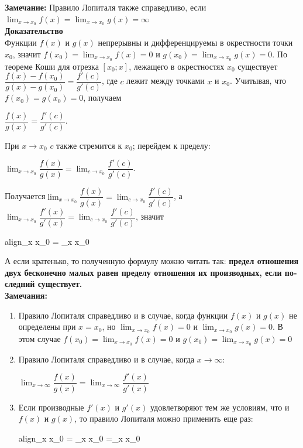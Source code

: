 \documentclass[oneside]{book}
\newcommand{\boxedeq}[2]{\begin{empheq}[box={\fboxsep=6pt\fbox}]{align}\label{#1}#2\end{empheq}}
\begin{document}
\begin{enumerate}
\begin{itemize}
\textbf{Замечание:}
Правило Лопиталя также справедливо, если  $\lim_{x \to x_{0}} f(x) =\lim_{x \to x_{0}} g(x) = \infty$\\

\textbf{Доказательство}\\
Функции $f(x)$ и $g(x)$ непрерывны и дифференцируемы в окрестности точки $x_{0}$, значит
$f(x_{0})=\lim_{x \to x_{0}} f(x) = 0$ и $g(x_{0})=\lim_{x \to x_{0}} g(x) = 0$. По теореме Коши для отрезка $[x_{0};x]$, лежащего в окрестностях $x_{0}$ существует $\dfrac{f(x)-f(x_{0})}{g(x)-g(x_{0})}=\dfrac{f'(c)}{g'(c)}$, где $c$ лежит между точками $x$ и $x_{0}$. Учитывая, что  $f(x_{0})=g(x_{0})=0$, получаем \begin{center}
	$\dfrac{f(x)}{g(x)}=\dfrac{f'(c)}{g'(c)}$.
\end{center} При $x\to x_{0}$ $c$ также стремится к $x_{0}$; перейдем к пределу: \begin{center}
	$\lim_{x \to x_{0}} \dfrac{f(x)}{g(x)} = \lim_{c \to x_{0}} \dfrac{f'(c)}{g'(c)}$.

\end{center}
Получается$\lim_{x \to x_{0}} \dfrac{f(x)}{g(x)} = \lim_{c \to x_{0}} \dfrac{f'(c)}{g'(c)}$, а $\lim_{x \to x_{0}} \dfrac{f'(x)}{g'(x)} = \lim_{c \to x_{0}} \dfrac{f'(c)}{g'(c)}$, значит \begin{center}
	\boxedeq{eq:*}{\lim_{x{\large } \to x_{0}}  = \lim_{x \to x_{0}} \dfrac{f'(x)}{g'(x)}}
\end{center}
А если кратенько, то полученную формулу можно читать так: \textbf{предел отношения двух
	бесконечно малых равен пределу отношения их производных, если по­
	следний существует.}\\

\textbf{Замечания:}
\begin{enumerate}

	\item Правило Лопиталя справедливо и в случае, когда функции $f(x)$ и $g(x)$ не определены при  $x=x_{0}$, но $\lim_{x \to x_{0}} f(x) = 0$ и $\lim_{x \to x_{0}} g(x) = 0$. В этом случае $f(x_{0})=\lim_{x \to x_{0}} f(x) = 0$ и $g(x_{0})=\lim_{x \to x_{0}} g(x) = 0$
	\item Правило Лопиталя справедливо и в случае, когда ${x \to \infty}$: \begin{center}
		$\lim_{x \to \infty} \dfrac{f(x)}{g(x)} = \lim_{x \to \infty} \dfrac{f'(x)}{g'(x)}$
	\end{center}
	\item Если производные $f'(x)$ и $g'(x)$ удовлетворяют тем же условиям, что и $f(x)$ и $g(x)$, то правило Лопиталя можно применить еще раз:\boxedeq{eq:*}{\lim_{x{\large } \to x_{0}}  = \lim_{x \to x_{0}} \dfrac{f'(x)}{g'(x)}=\lim_{x \to x_{0}} \dfrac{f''(x)}{g''(x)}}


\end{enumerate}
\end{itemize}
\end{enumerate}
\end{document}

